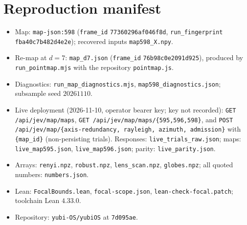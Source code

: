 \documentclass[11pt,a4paper]{article}
\theoremstyle{plain}
\theoremstyle{remark}
\begin{document}
\section*{Reproduction manifest}
{\sloppy
\begin{itemize}
\item Map: \texttt{map-json:598} (\texttt{frame\_id} \texttt{77360296af046f8d}, \texttt{run\_fingerprint} \texttt{fba40c7b482d4e2e}); recovered inputs \texttt{map598\_X.npy}.
\item Re-map at $d=7$: \texttt{map\_d7.json} (\texttt{frame\_id} \texttt{76b98c0e2091d925}), produced by \texttt{run\_pointmap.mjs} with the repository \texttt{pointmap.js}.
\item Diagnostics: \texttt{run\_map\_diagnostics.mjs}, \texttt{map598\_diagnostics.json}; subsample seed $20261110$.
\item Live deployment (2026-11-10, operator bearer key; key not recorded): \texttt{GET /api/jev/map/maps}, \texttt{GET /api/jev/map/maps/\{595,596,598\}}, and \texttt{POST /api/jev/map/\{axis-redundancy, rayleigh, azimuth, admission\}} with \texttt{\{map\_id\}} (non-persisting trials). Responses: \texttt{live\_trials\_raw.json}; maps: \texttt{live\_map595.json}, \texttt{live\_map596.json}; parity: \texttt{live\_parity.json}.
\item Arrays: \texttt{renyi.npz}, \texttt{robust.npz}, \texttt{lens\_scan.npz}, \texttt{globes.npz}; all quoted numbers: \texttt{numbers.json}.
\item Lean: \texttt{FocalBounds.lean}, \texttt{focal-scope.json}, \texttt{lean-check-focal.patch}; toolchain Lean $4.33.0$.
\item Repository: \texttt{yubi-OS/yubiOS} at \texttt{7d095ae}.
\end{itemize}\par}
\end{document}
